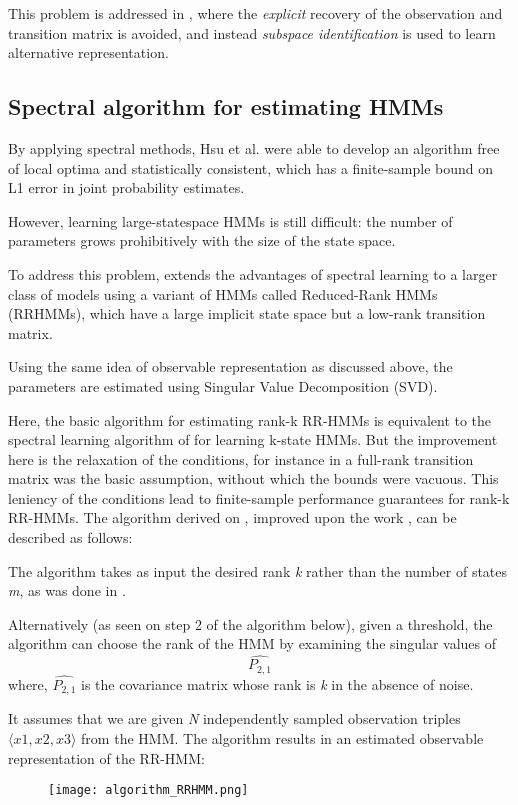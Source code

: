 This problem is addressed in \cite{ref2}, where the \textit{explicit} recovery of the observation and transition matrix is avoided, and instead \textit{subspace identification} is used to learn alternative representation.

\subsection{Spectral algorithm for estimating HMMs}

By applying spectral methods, Hsu et al.\cite{ref2} were able to develop an algorithm free of local optima and statistically consistent, which has a finite-sample bound on L1 error in joint probability estimates. 

However, learning large-statespace HMMs is still difficult: the number of parameters
grows prohibitively with the size of the state space.

To address this problem, \cite{ref7} extends the advantages of spectral
learning to a larger class of models using a variant of HMMs called Reduced-Rank HMMs (RRHMMs), which have a large implicit state space but a low-rank transition matrix.

Using the same idea of observable representation as discussed above, the parameters are estimated using Singular Value Decomposition (SVD).


Here, the basic algorithm for estimating rank-k RR-HMMs is
equivalent to the spectral learning algorithm of \cite{ref2} for learning k-state HMMs. But the improvement here is the relaxation of the conditions, for instance in \cite{ref2} a full-rank transition matrix was the basic assumption, without which the bounds were vacuous. This leniency of the conditions lead to finite-sample performance guarantees for rank-k RR-HMMs.
\newline
\newline
The algorithm derived on \cite{ref7}, improved upon the work \cite{ref2}, can be described as follows:

The algorithm takes as input the desired rank \textit{k}
rather than the number of states \textit{m}, as was done in \cite{ref2}.

Alternatively (as seen on step 2 of the algorithm below), given a threshold, the algorithm can choose the rank of the HMM by examining the singular values of \[\widehat{{P}_{2,1}}\]
 \quad where, $ \widehat{{P}_{2,1}} $ is the covariance matrix whose rank is \textit{k} in the absence of noise. 

It assumes that we are given \textit{N} independently sampled
observation triples $\langle x1, x2, x3\rangle$ from the HMM. 
The algorithm results in an estimated observable representation of the RR-HMM:
\newline
\begin{figure}[h]
    \centering
    \texttt{[image: algorithm\_RRHMM.png]}        
\end{figure}

